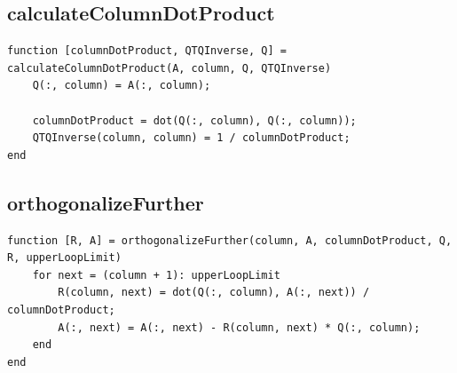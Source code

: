 \subsection{calculateColumnDotProduct}
\begin{simplechar}
\begin{lstlisting}
function [columnDotProduct, QTQInverse, Q] = calculateColumnDotProduct(A, column, Q, QTQInverse)
    Q(:, column) = A(:, column);

    columnDotProduct = dot(Q(:, column), Q(:, column));
    QTQInverse(column, column) = 1 / columnDotProduct;
end
\end{lstlisting}
\end{simplechar}

\subsection{orthogonalizeFurther}
\begin{simplechar}
\begin{lstlisting}
function [R, A] = orthogonalizeFurther(column, A, columnDotProduct, Q, R, upperLoopLimit)
    for next = (column + 1): upperLoopLimit
        R(column, next) = dot(Q(:, column), A(:, next)) / columnDotProduct;
        A(:, next) = A(:, next) - R(column, next) * Q(:, column);
    end
end
\end{lstlisting}
\end{simplechar}

